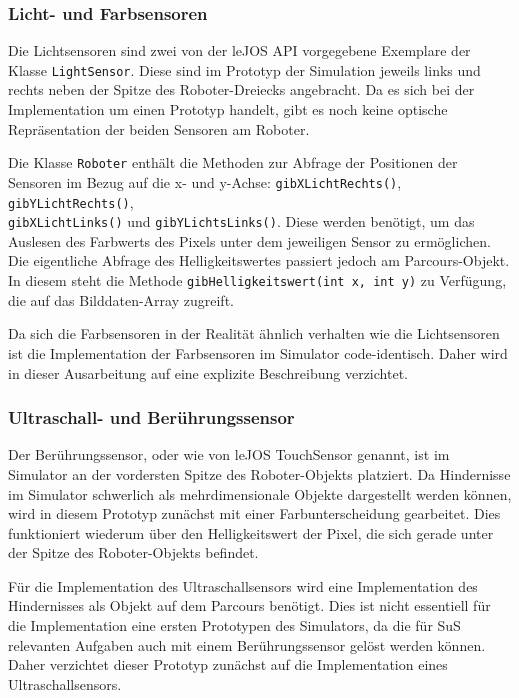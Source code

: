 \documentclass[paper=a4, pagesize, DIV=calc, BCOR=15mm, twoside=on, onecolumn=on, open = right, titlepage =on, parskip =half-, headsepline = on, footsepline = on, chapterprefix = on, appendixprefix = off, fontsize = 12pt, numbers = noenddot, abstract = on]{scrbook}
\numberwithin{equation}{chapter}
\theoremstyle{definition}
\theoremstyle{plain}
\theoremstyle{plain}
\theoremstyle{remark}
\theoremstyle{plain}
\theoremstyle{plain}
\begin{document}
\subsubsection{Licht- und Farbsensoren}
Die Lichtsensoren sind zwei von der leJOS API vorgegebene Exemplare der Klasse \texttt{LightSensor}. Diese sind im Prototyp der Simulation jeweils  links und rechts neben der Spitze des Roboter-Dreiecks angebracht. Da es sich bei der Implementation um einen Prototyp handelt, gibt es noch keine optische Repräsentation der beiden Sensoren am Roboter.

Die Klasse \texttt{Roboter} enthält die Methoden zur Abfrage der Positionen der Sensoren im Bezug auf die x- und y-Achse: \texttt{gibXLichtRechts()}, \texttt{gibYLichtRechts()},\\
\texttt{gibXLichtLinks()} und \texttt{gibYLichtsLinks()}. Diese werden benötigt, um das Auslesen des Farbwerts des Pixels unter dem jeweiligen Sensor zu ermöglichen. Die eigentliche Abfrage des Helligkeitswertes passiert jedoch am Parcours-Objekt. In diesem steht die Methode \texttt{gibHelligkeitswert(int x, int y)} zu Verfügung, die auf das Bilddaten-Array zugreift.

Da sich die Farbsensoren in der Realität ähnlich verhalten wie die Lichtsensoren ist die Implementation der Farbsensoren im Simulator code-identisch. Daher wird in dieser Ausarbeitung auf eine explizite Beschreibung verzichtet.

\subsubsection{Ultraschall- und Berührungssensor}
Der Berührungssensor, oder wie von leJOS TouchSensor genannt, ist im Simulator an der vordersten Spitze des Roboter-Objekts platziert. Da Hindernisse im Simulator schwerlich als mehrdimensionale Objekte dargestellt werden können, wird in diesem Prototyp zunächst mit einer Farbunterscheidung gearbeitet. Dies funktioniert wiederum über den Helligkeitswert der Pixel, die sich gerade unter der Spitze des Roboter-Objekts befindet.

Für die Implementation des Ultraschallsensors wird eine Implementation des Hindernisses als Objekt auf dem Parcours benötigt. Dies ist nicht essentiell für die Implementation eine ersten Prototypen des Simulators, da die für SuS relevanten Aufgaben auch mit einem Berührungssensor gelöst werden können. Daher verzichtet dieser Prototyp zunächst auf die Implementation eines Ultraschallsensors.
\end{document}
